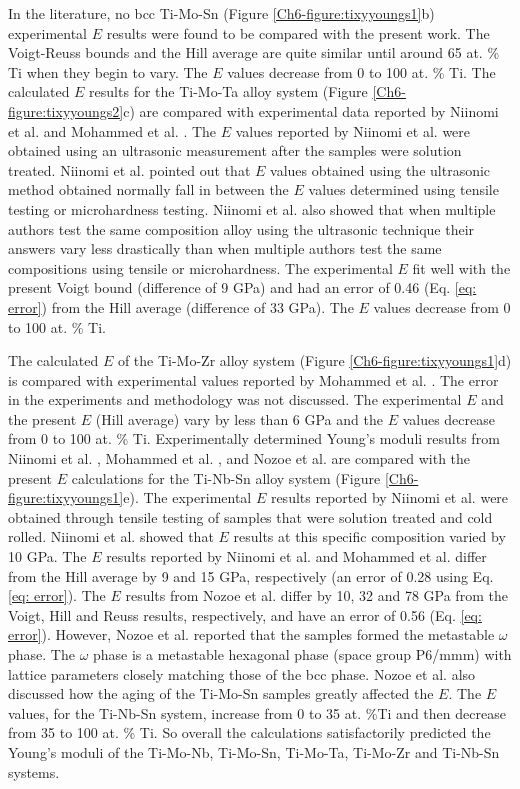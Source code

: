 In the literature, no bcc Ti-Mo-Sn (Figure \ref{Ch6-figure:tixyyoungs1}b) experimental $E$ results were found to be compared with the present work. The Voigt-Reuss bounds and the Hill average are quite similar until around 65 at. \% Ti when they begin to vary. The $E$ values decrease from 0 to 100 at. \% Ti. The calculated $E$ results for the Ti-Mo-Ta alloy system (Figure \ref{Ch6-figure:tixyyoungs2}c) are compared with experimental data reported by Niinomi et al. \cite{Niinomi2012}and Mohammed et al. \cite{Mohammed2014}. The $E$ values reported by Niinomi et al. \cite{Niinomi2012} were obtained using an ultrasonic measurement after the samples were solution treated. Niinomi et al. \cite{Niinomi2012} pointed out that $E$ values obtained using the ultrasonic method obtained normally fall in between the $E$ values determined using tensile testing or microhardness testing. Niinomi et al. \cite{Niinomi2012} also showed that when multiple authors test the same composition alloy using the ultrasonic technique their answers vary less drastically than when multiple authors test the same compositions using tensile or microhardness. The experimental $E$ fit well with the present Voigt bound (difference of 9 GPa) and had an error of 0.46 (Eq. \ref{eq: error}) from the Hill average (difference of 33 GPa). The $E$ values decrease from 0 to 100 at. \% Ti. 

The calculated $E$ of the Ti-Mo-Zr alloy system (Figure \ref{Ch6-figure:tixyyoungs1}d) is compared with experimental values reported by Mohammed et al. \cite{Mohammed2014}. The error in the experiments and methodology was not discussed. The experimental $E$ \cite{Mohammed2014} and the present $E$ (Hill average) vary by less than 6 GPa and the $E$ values decrease from 0 to 100 at. \% Ti. Experimentally determined Young's moduli results from Niinomi et al. \cite{Niinomi2012}, Mohammed et al. \cite{Mohammed2014}, and Nozoe et al. \cite{Nozoe2007} are compared with the present $E$ calculations for the Ti-Nb-Sn alloy system (Figure \ref{Ch6-figure:tixyyoungs1}e). The experimental $E$ results reported by Niinomi et al. \cite{Niinomi2012} were obtained through tensile testing of samples that were solution treated and cold rolled. Niinomi et al. showed that $E$ results at this specific composition varied by 10 GPa. The $E$ results reported by Niinomi et al. \cite{Niinomi2012} and Mohammed et al. \cite{Mohammed2014} differ from the Hill average by 9 and 15 GPa, respectively (an error of 0.28 using Eq. \ref{eq: error}). The $E$ results from Nozoe et al. \cite{Nozoe2007} differ by 10, 32 and 78 GPa from the Voigt, Hill and Reuss results, respectively, and have an error of 0.56 (Eq. \ref{eq: error}). However, Nozoe et al. reported that the samples formed the metastable $\omega$ phase. The $\omega$ phase is a metastable hexagonal phase (space group P6/mmm) with lattice parameters closely matching those of the bcc phase. Nozoe et al. \cite{Nozoe2007} also discussed how the aging of the Ti-Mo-Sn samples greatly affected the $E$. The $E$ values, for the Ti-Nb-Sn system, increase from 0 to 35 at. \%Ti and then decrease from 35 to 100 at. \% Ti. So overall the calculations satisfactorily predicted the Young's moduli of the Ti-Mo-Nb, Ti-Mo-Sn, Ti-Mo-Ta, Ti-Mo-Zr and Ti-Nb-Sn systems. 

